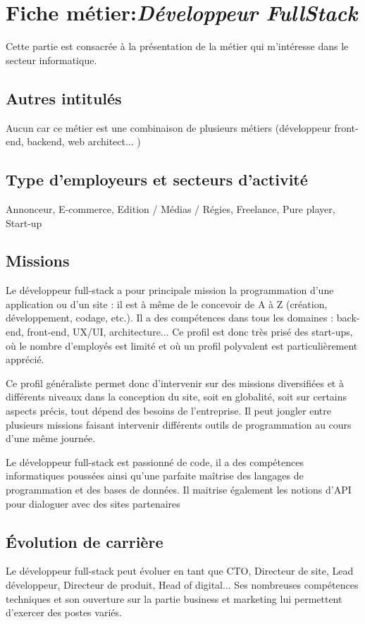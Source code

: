 \documentclass[a4paper, 12pt,french,oneside]{book}%
\theoremstyle{definition}
\theoremstyle{remark}
\begin{document}
\restoregeometry
\dominitoc%
\setcounter{tocdepth}{7}
\tableofcontents
\thispagestyle{empty}

\chapter{Fiche métier:\textit{Développeur FullStack}}
Cette partie est consacrée à la présentation de la métier qui m'intéresse dans le secteur informatique. 
\section{Autres intitulés}
Aucun car ce métier est une combinaison de plusieurs métiers (développeur front-end, backend, web architect... )
\section{Type d’employeurs et secteurs d’activité}
Annonceur, E-commerce, Edition / Médias / Régies, Freelance, Pure player, Start-up
\section{Missions}
Le développeur full-stack a pour principale mission la programmation d’une application ou
d’un site : il est à même de le concevoir de A à Z (création, développement, codage, etc.). Il a des compétences dans tous les domaines : back-end, front-end, UX/UI, architecture...
Ce profil est donc très prisé des start-ups, où le nombre d’employés est limité et où un profil polyvalent est particulièrement apprécié.

Ce profil généraliste permet donc d’intervenir sur des missions diversifiées et à différents niveaux dans la conception du site, soit en globalité, soit sur certains aspects précis, tout dépend des besoins de l’entreprise. Il peut jongler entre plusieurs missions faisant intervenir différents outils de programmation au cours d’une même journée.

Le développeur full-stack est passionné de code, il a des compétences informatiques poussées ainsi qu’une parfaite maîtrise des langages de programmation et des bases de données. Il maitrise également les notions d’API pour dialoguer avec des sites partenaires
\section{Évolution de carrière}
Le développeur full-stack peut évoluer en tant que CTO, Directeur de site, Lead développeur,
Directeur de produit, Head of digital... Ses nombreuses compétences techniques et son ouverture sur la partie business et marketing lui permettent d’exercer des postes variés.
\end{document}
